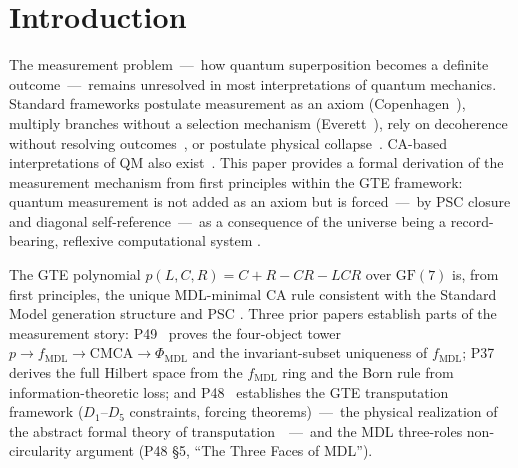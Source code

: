 \documentclass[11pt]{article}
\theoremstyle{remark}
\newcommand{\PHIMDL}{\ensuremath{\Phi_{\mathrm{MDL}}}}
\newcommand{\GF}[1]{\ensuremath{\mathrm{GF}(#1)}}
\newcommand{\CMCA}{\text{CMCA}}
\newcommand{\fmdl}{\ensuremath{f_{\mathrm{MDL}}}}
\begin{document}
\section{Introduction}
\label{sec:intro}

The measurement problem~---~how quantum superposition becomes a definite
outcome~---~remains unresolved in most interpretations of quantum mechanics.
Standard frameworks postulate measurement as an axiom (Copenhagen~\cite{Bohm1952}),
multiply branches without a selection mechanism (Everett~\cite{Everett1957}),
rely on decoherence without resolving outcomes~\cite{Zurek2003},
or postulate physical collapse~\cite{GhirardiRiminiWeber1986}.
CA-based interpretations of QM also exist~\cite{tHooft2016CA,Wolfram2002}.
This paper provides a formal derivation of the measurement mechanism from
first principles within the GTE framework: quantum measurement is not added
as an axiom but is forced~---~by PSC closure and diagonal self-reference~---~as
a consequence of the universe being a record-bearing, reflexive computational
system \cite{SpivackGTECompleteFramework,SpivackQMFromR110}.

The GTE polynomial $p(L,C,R) = C+R-CR-LCR$ over $\GF{7}$ is, from first
principles, the unique MDL-minimal CA rule consistent with the Standard Model
generation structure and PSC \cite{SpivackGTEPolynomialWolfram,SpivackGTEPolynomialUFT}.
Three prior papers establish parts of the measurement story:
P49~\cite{SpivackGTEPolynomialWolfram} proves the four-object tower
$p \to \fmdl{} \to \CMCA \to \PHIMDL$ and the invariant-subset uniqueness
of $\fmdl{}$; P37~\cite{SpivackQMFromR110} derives the full Hilbert space
from the \fmdl{} ring and the Born rule from information-theoretic loss; and
P48~\cite{SpivackGTECompleteFramework} establishes the GTE transputation framework
($D_1$--$D_5$ constraints, forcing theorems)~---~the physical realization of the
abstract formal theory of transputation~\cite{SpivackNEMS76,SpivackNEMS77}~---~and
the MDL three-roles non-circularity argument (P48 \S5, ``The Three Faces of MDL'').
\end{document}
